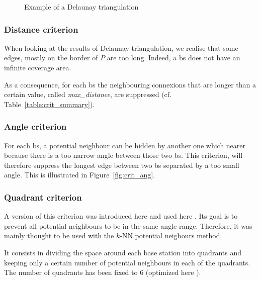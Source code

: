 \documentclass[lettersize,journal,english]{IEEEtran}
\begin{document}
\begin{figure}[!t]
    \centering
    \caption{Example of a Delaunay triangulation}
    \label{fig:crit_nei}
\end{figure}

\subsubsection{Distance criterion}
When looking at the results of Delaunay triangulation, we realise that some edges, mostly on the border of $P$ are too long. Indeed, a \acrshort{bs} does not have an infinite coverage area.

As a consequence, for each \acrshort{bs} the neighbouring connexions that are longer than a certain value, called \emph{max\_distance}, are suppressed (cf. Table~\ref{table:crit_summary}).

\subsubsection{Angle criterion}
For each \acrshort{bs}, a potential neighbour can be \og hidden\fg{} by another one which nearer because there is a too narrow angle between those two \acrshort{bs}.
This criterion, will therefore suppress the longest edge between two \acrshort{bs} separated by a too small angle. This is illustrated in Figure~\ref{fig:crit_ang}.

\subsubsection{Quadrant criterion}
A version of this criterion was introduced here \cite{10201211} and used here \cite{art_del_paq}. Its goal is
to prevent all potential neighbours to be in the same angle range. Therefore, it was mainly thought to be used with the 
$k$-NN potential neigbours method.

It consists in dividing the space around each base station into quadrants and keeping only a certain number of potential neighbours
in each of the quadrants. The number of quadrants has been fixed to 6 (optimized here \cite{art_del_paq}).
\end{document}
